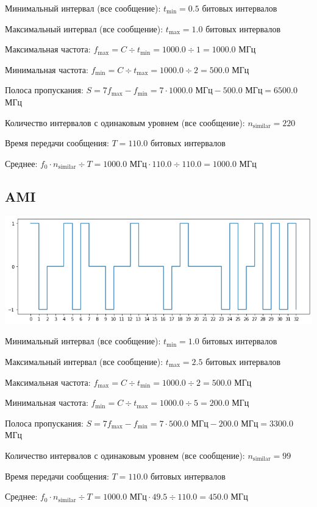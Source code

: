 Минимальный интервал (все сообщение): $t_\mathrm{min}=0.5$ битовых интервалов

Максимальный интервал (все сообщение): $t_\mathrm{max}=1.0$ битовых интервалов

Максимальная частота: $f_\mathrm{max}=C\div t_\mathrm{min}=1000.0\div 1=1000.0$ МГц

Минимальная частота: $f_\mathrm{min}=C\div t_\mathrm{max}=1000.0\div 2=500.0$ МГц

Полоса пропускания: $S=7f_\mathrm{max}-f_\mathrm{min} = 7\cdot 1000.0\text{ МГц}-500.0\text{ МГц}=6500.0$ МГц

Количество интервалов с одинаковым уровнем (все сообщение): $n_\mathrm{similar}=220$

Время передачи сообщения: $T=110.0$ битовых интервалов

Среднее: $f_0\cdot n_\mathrm{similar}\div T=1000.0\text{ МГц}\cdot 110.0\div 110.0=1000.0$ МГц

\subsection{AMI}
\includegraphics[width=\textwidth]{2ami}

Минимальный интервал (все сообщение): $t_\mathrm{min}=1.0$ битовых интервалов

Максимальный интервал (все сообщение): $t_\mathrm{max}=2.5$ битовых интервалов

Максимальная частота: $f_\mathrm{max}=C\div t_\mathrm{min}=1000.0\div 2=500.0$ МГц

Минимальная частота: $f_\mathrm{min}=C\div t_\mathrm{max}=1000.0\div 5=200.0$ МГц

Полоса пропускания: $S=7f_\mathrm{max}-f_\mathrm{min} = 7\cdot 500.0\text{ МГц}-200.0\text{ МГц}=3300.0$ МГц

Количество интервалов с одинаковым уровнем (все сообщение): $n_\mathrm{similar}=99$

Время передачи сообщения: $T=110.0$ битовых интервалов

Среднее: $f_0\cdot n_\mathrm{similar}\div T=1000.0\text{ МГц}\cdot 49.5\div 110.0=450.0$ МГц


